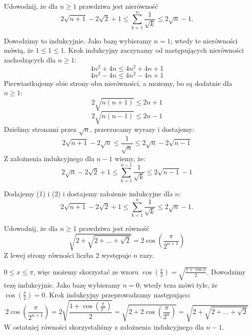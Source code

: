 \documentclass{../note}
\begin{document}
\begin{zadanie}{1}
Udowodnij, że dla $n \geq 1$ prawdziwa jest nierówność
\[
2\sqrt{n+1} - 2\sqrt{2} + 1 \leq \sum_{k=1}^{n} \frac{1}{\sqrt{k}} \leq 2\sqrt{n} - 1.
\]
\end{zadanie}
\begin{rozwiazanie}
Dowodzimy to indukcyjnie. Jako bazę wybieramy $n=1$; wtedy te nierówności mówią, że $1 \leq 1 \leq 1$. Krok indukcyjny zaczynamy od następujących nierówności zachodzących dla $n \geq 1$:
\[4n^2 + 4n \leq 4n^2 + 4n + 1\]
\[4n^2 - 4n \leq 4n^2 - 4n + 1\]
Pierwiastkujemy obie strony obu nierówności, a możemy, bo są dodatnie dla $n \geq 1$:
\[2 \sqrt{n(n + 1)} \leq 2n + 1\]
\[2 \sqrt{n(n - 1)} \leq 2n - 1\]
Dzielimy stronami przez $\sqrt{n}$, przerzucamy wyrazy i dostajemy:
\begin{equation}
2\sqrt{n+1} - 2\sqrt{n} \leq \frac{1}{\sqrt{n}} \leq 2\sqrt{n} - 2\sqrt{n-1}
\end{equation}
Z założnenia indukcyjnego dla $n - 1$ wiemy, że:
\begin{equation}
2\sqrt{n} - 2\sqrt{2} + 1 \leq \sum_{k=1}^{n-1} \frac{1}{\sqrt{k}} \leq 2\sqrt{n-1} - 1
\end{equation}

Dodajemy (1) i (2) i dostajemy założenie indukcyjne dla $n$:
\[
2\sqrt{n+1} - 2\sqrt{2} + 1 \leq \sum_{k=1}^{n} \frac{1}{\sqrt{k}} \leq 2\sqrt{n} - 1.
\]
\end{rozwiazanie}

\begin{zadanie}{2}
Udowodnij, że dla $n\ge1$ prawdziwa jest równość
\[\sqrt{2+\sqrt{2+...+\sqrt{2}}}=2\cos\left(\frac{\pi}{2^{n+1}}\right)\]
Z lewej strony równości liczba 2 występuje $n$ razy.
\end{zadanie}
\begin{rozwiazanie}
$0 \leq x \leq \pi$, więc możemy skorzystać ze wzoru $\cos\left(\frac{x}{2}\right) = \sqrt{\frac{1+\cos x}{2}}$. Dowodzimy tezę indukcyjnie. Jako bazę wybieramy $n = 0$; wtedy teza mówi tyle, że $\cos\left(\frac{\pi}{2}\right) = 0$. Krok indukcyjny przeprowadzamy następująco:
\[2\cos\left(\frac{\pi}{2^{n+1}}\right) = 2\sqrt{\frac{1+\cos\left(\frac{\pi}{2^n}\right)}{2}} = \sqrt{2 + 2\cos\left(\frac{\pi}{2^n}\right)} = \sqrt{2+\sqrt{2+...+\sqrt{2}}}\]
W ostatniej równości skorzystaliśmy z założnenia indukcyjnego dla $n - 1$.
\end{rozwiazanie}
\end{document}
